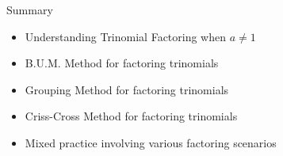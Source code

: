 \documentclass[aspectratio=169]{beamer}
\begin{document}
\begin{frame}{Summary}
    \begin{tcolorbox}[colback=lightgray,colframe=primary,title=Key Concepts]
        \footnotesize
        \begin{itemize}
            \item Understanding Trinomial Factoring when $a \neq 1$
            \item B.U.M. Method for factoring trinomials
            \item Grouping Method for factoring trinomials
            \item Criss-Cross Method for factoring trinomials
            \item Mixed practice involving various factoring scenarios
        \end{itemize}
    \end{tcolorbox}
\end{frame}
\end{document}
